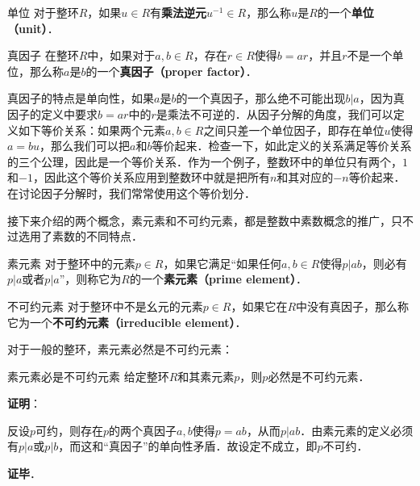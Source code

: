 \begin{definition}{单位}
对于整环$R$，如果$u\in R$有\textbf{乘法逆元}$u^{-1}\in R$，那么称$u$是$R$的一个\textbf{单位（unit）}．
\end{definition}

\begin{definition}{真因子}
在整环$R$中，如果对于$a, b\in R$，存在$r\in R$使得$b=ar$，并且$r$不是一个单位，那么称$a$是$b$的一个\textbf{真因子（proper factor）}．
\end{definition}

真因子的特点是单向性，如果$a$是$b$的一个真因子，那么绝不可能出现$b|a$，因为真因子的定义中要求$b=ar$中的$r$是乘法不可逆的．从因子分解的角度，我们可以定义如下等价关系：如果两个元素$a, b\in R$之间只差一个单位因子，即存在单位$u$使得$a=bu$，那么我们可以把$a$和$b$等价起来．检查一下，如此定义的关系满足等价关系的三个公理，因此是一个等价关系．作为一个例子，整数环中的单位只有两个，$1$和$-1$，因此这个等价关系应用到整数环中就是把所有$n$和其对应的$-n$等价起来．在讨论因子分解时，我们常常使用这个等价划分．

接下来介绍的两个概念，素元素和不可约元素，都是整数中素数概念的推广，只不过选用了素数的不同特点．

\begin{definition}{素元素}
对于整环中的元素$p\in R$，如果它满足“如果任何$a, b\in R$使得$p|ab$，则必有$p|a$或者$p|a$”，则称它为$R$的一个\textbf{素元素（prime element）}．
\end{definition}

\begin{definition}{不可约元素}
对于整环中不是幺元的元素$p\in R$，如果它在$R$中没有真因子，那么称它为一个\textbf{不可约元素（irreducible element）}．
\end{definition}

对于一般的整环，素元素必然是不可约元素：

\begin{theorem}{素元素必是不可约元素}
给定整环$R$和其素元素$p$，则$p$必然是不可约元素．
\end{theorem}

\textbf{证明}：

反设$p$可约，则存在$p$的两个真因子$a, b$使得$p=ab$，从而$p|ab$．由素元素的定义必须有$p|a$或$p|b$，而这和“真因子”的单向性矛盾．故设定不成立，即$p$不可约．

\textbf{证毕}．



